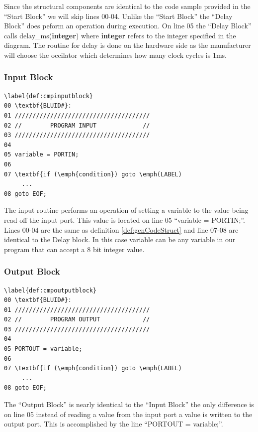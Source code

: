 Since the structural components are identical to the code sample provided in the ``Start Block'' we will skip lines 00-04. Unlike the ``Start Block'' the ``Delay Block'' does peform an operation during execution. On line 05 the ``Delay Block'' calls delay_ms(\textbf{integer}) where \textbf{integer} refers to the integer specified in the diagram. The routine for delay is done on the hardware side as the manufacturer will choose the occilator which determines how many clock cycles is 1ms.

\subsubsection{Input Block}
\begin{lstlisting}
\label{def:cmpinputblock}
00 \textbf{BLUID#}:
01 //////////////////////////////////////
02 //        PROGRAM INPUT             //
03 //////////////////////////////////////
04
05 variable = PORTIN;
06 
07 \textbf{if (\emph{condition}) goto \emph(LABEL)
     ...
08 goto EOF;
\end{lstlisting}

The input routine performs an operation of setting a variable to the value being read off the input port. This value is located on line 05 ``variable = PORTIN;''. Lines 00-04 are the same as definition \ref{def:genCodeStruct} and line 07-08 are identical to the Delay block. In this case variable can be any variable in our program that can accept a 8 bit integer value.


\subsubsection{Output Block}
\begin{lstlisting}
\label{def:cmpoutputblock}
00 \textbf{BLUID#}:
01 //////////////////////////////////////
02 //        PROGRAM OUTPUT            //
03 //////////////////////////////////////
04
05 PORTOUT = variable;
06 
07 \textbf{if (\emph{condition}) goto \emph(LABEL)
     ...
08 goto EOF;
\end{lstlisting}

The ``Output Block'' is nearly identical to the ``Input Block'' the only difference is on line 05 instead of reading a value from the input port a value is written to the output port. This is accomplished by the line ``PORTOUT = variable;''.


